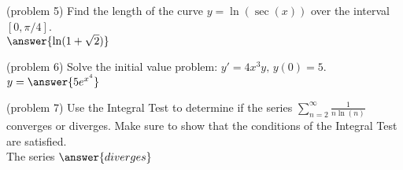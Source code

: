 \documentclass[handout]{ximera}
\begin{document}
\begin{problem}(problem 5)
Find the length of the curve $\displaystyle y = \ln(\sec(x))$ over the interval $[0, \pi/4]$.\\
$\answer{\ln(1 + \sqrt{2})}$
\end{problem}


\begin{problem}(problem 6)
Solve the initial value problem: $\displaystyle y' = 4x^3 y,\, y(0) = 5$.\\
$y = \answer{5e^{x^4}}$
\end{problem}


\begin{problem}(problem 7)
Use the Integral Test to determine if the series $\displaystyle \sum_{n=2}^\infty \frac{1}{n\ln(n)}$
converges or diverges. Make sure to show that the
conditions of the Integral Test are satisfied.\\
The series $\answer{diverges}$
\end{problem}
\end{document}
